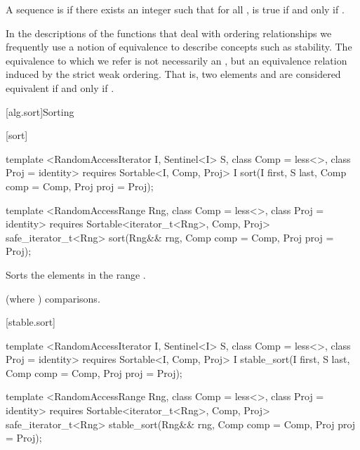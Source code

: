 \pnum
A sequence
is
if there exists an integer
such that for all
,
is true if and only if
.

\pnum
In the descriptions of the functions that deal with ordering relationships we frequently use a notion of
equivalence to describe concepts such as stability.
The equivalence to which we refer is not necessarily an
,
but an equivalence relation induced by the strict weak ordering.
That is, two elements
and
are considered equivalent if and only if
.

[alg.sort]{Sorting}

[sort]{}

%
\begin{itemdecl}
template <RandomAccessIterator I, Sentinel<I> S, class Comp = less<>,
    class Proj = identity>
  requires Sortable<I, Comp, Proj>
  I sort(I first, S last, Comp comp = Comp{}, Proj proj = Proj{});

template <RandomAccessRange Rng, class Comp = less<>, class Proj = identity>
  requires Sortable<iterator_t<Rng>, Comp, Proj>
  safe_iterator_t<Rng>
    sort(Rng&& rng, Comp comp = Comp{}, Proj proj = Proj{});
\end{itemdecl}

\begin{itemdescr}
\pnum
\effects
Sorts the elements in the range
.

\pnum
\complexity
{}
(where
)
comparisons.
\end{itemdescr}

[stable.sort]{}

%
\begin{itemdecl}
template <RandomAccessIterator I, Sentinel<I> S, class Comp = less<>,
    class Proj = identity>
  requires Sortable<I, Comp, Proj>
  I stable_sort(I first, S last, Comp comp = Comp{}, Proj proj = Proj{});

template <RandomAccessRange Rng, class Comp = less<>, class Proj = identity>
  requires Sortable<iterator_t<Rng>, Comp, Proj>
  safe_iterator_t<Rng>
    stable_sort(Rng&& rng, Comp comp = Comp{}, Proj proj = Proj{});
\end{itemdecl}

